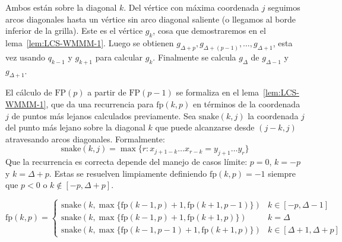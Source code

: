   Ambos están sobre la diagonal \(k\).
  Del vértice con máxima coordenada \(j\) seguimos arcos diagonales
  hasta un vértice sin arco diagonal saliente
  (o llegamos al borde inferior de la grilla).
  Este es el vértice \(g_k\),
  cosa que demostraremos en el lema~\ref{lem:LCS-WMMM-1}.
  Luego se obtienen
    \(g_{\Delta + p}, g_{\Delta + (p - 1)}, \dotsc, g_{\Delta + 1}\),
  esta vez usando \(q_{k - 1}\) y \(g_{k + 1}\) para calcular \(g_k\).
  Finalmente se calcula \(g_\Delta\)
  de \(g_{\Delta - 1}\) y \(g_{\Delta + 1}\).

  El cálculo de \(\mathrm{FP}(p)\)
  a partir de \(\mathrm{FP}(p - 1)\)
  se formaliza en el lema~\ref{lem:LCS-WMMM-1},
  que da una recurrencia para \(\mathrm{fp}(k, p)\)
  en términos de la coordenada \(j\)
  de puntos más lejanos calculados previamente.
  Sea \(\mathrm{snake}(k, j)\) la coordenada \(j\) del punto más lejano
  sobre la diagonal \(k\) que puede alcanzarse desde \((j - k, j)\)
  atravesando arcos diagonales.
  Formalmente:
  \begin{equation*}
    \mathrm{snake}(k, j)
      = \max \{ r \colon x_{j + 1 - k} \dots x_{r - k} = y_{j + 1} \dots y_r \}
  \end{equation*}
  Que la recurrencia es correcta depende del manejo de casos límite:
  \(p = 0\), \(k = - p\) y \(k = \Delta + p\).
  Estas se resuelven limpiamente definiendo
  \(\mathrm{fp}(k, p) = -1\)
  siempre que \(p < 0\) o \(k \notin [-p, \Delta + p]\).
  \begin{lemma}
    \label{lem:LCS-WMMM-1}
    \begin{equation*}
      \mathrm{fp}(k, p)
        = \begin{cases}
            \mathrm{snake}(k,
               \max \{ \mathrm{fp}(k - 1, p) + 1,
                       \mathrm{fp}(k + 1, p - 1) \})
              & k \in [-p, \Delta - 1] \\
            \mathrm{snake}(k,
               \max \{ \mathrm{fp}(k - 1, p) + 1,
                       \mathrm{fp}(k + 1, p) \})
              & k = \Delta\\
            \mathrm{snake}(k,
               \max \{ \mathrm{fp}(k - 1, p - 1) + 1,
                       \mathrm{fp}(k + 1, p) \})
              & k \in [\Delta + 1, \Delta + p]
          \end{cases}
    \end{equation*}
  \end{lemma}
